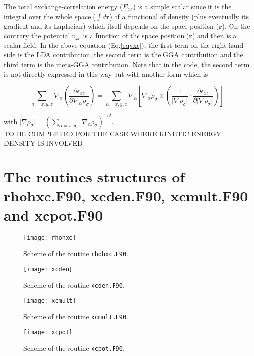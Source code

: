 \documentclass[a4paper,12pt]{report}
\begin{document}
The total exchange-correlation energy ($E_{xc}$) is a simple scalar since it is the integral over the whole space ($\int d\mathbf{r}$) of a functional of density (plus eventually its gradient and its Laplacian) which itself depends on the space position ($\mathbf{r}$). On the contrary the potential $v_{xc}$ is a function of the space position ($\mathbf{r}$) and then is a scalar field. In the above equation (Eq.\ref{eqvxc}), the first term on the right hand side is the LDA contribution, the second term is the GGA contribution and the third term is the meta-GGA contribution.
Note that in the code, the second term is not directly expressed in this way but with another form which is

\begin{equation}
\sum_{\alpha=x,y,z} \nabla_{\alpha} \left( \frac{\partial \epsilon_{xc}}{\partial \nabla_{\alpha} \rho_{\sigma}} \right) = \sum_{\alpha=x,y,z} \nabla_{\alpha} \left[ \nabla_{\alpha} \rho_{\sigma} \times \left( \frac{1}{\vert \nabla \rho_{\sigma} \vert }\cdotp \frac{\partial \epsilon_{xc}}{\partial \vert \nabla \rho_{\sigma}\vert } \right) \right]
\end{equation}

with $\vert \nabla \rho_{\sigma} \vert = \left(\sum_{\alpha=x,y,z} \nabla_{\alpha}\rho_{\sigma}\right)^{1/2}$.\\

TO BE COMPLETED FOR THE CASE WHERE KINETIC ENERGY DENSITY IS INVOLVED

\chapter{The routines structures of rhohxc.F90, xcden.F90, xcmult.F90 and xcpot.F90}

\begin{figure}[!ht]
	\centering
	\texttt{[image: rhohxc]}
	\caption{Scheme of the routine \texttt{rhohxc.F90}.}
	\label{figrhohxc}
\end{figure}

\begin{figure}[!ht]
	\centering
	\texttt{[image: xcden]}
	\caption{Scheme of the routine \texttt{xcden.F90}.}
	\label{figxcden}
\end{figure}

\begin{figure}[!ht]
	\centering
	\texttt{[image: xcmult]}
	\caption{Scheme of the routine \texttt{xcmult.F90}.}
	\label{figxcmult}
\end{figure}

\begin{figure}[!ht]
	\centering
	\texttt{[image: xcpot]}
	\caption{Scheme of the routine \texttt{xcpot.F90}.}
	\label{figxcpot}
\end{figure}
\end{document}
